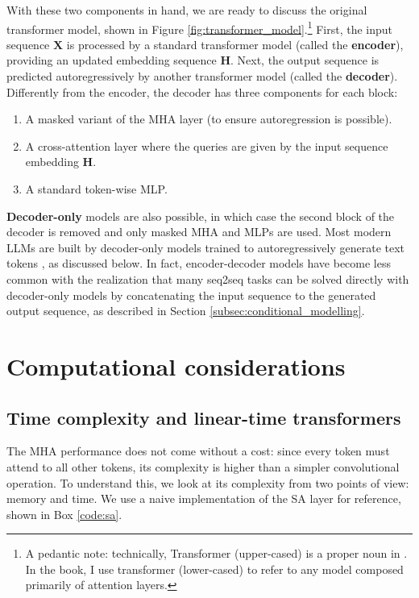 With these two components in hand, we are ready to discuss the original transformer model, shown in Figure \ref{fig:transformer_model}.\footnote{A pedantic note: technically, Transformer (upper-cased) is a proper noun in \cite{vaswani2017attention}. In the book, I use transformer (lower-cased) to refer to any model composed primarily of attention layers.} First, the input sequence $\mathbf{X}$ is processed by a standard transformer model (called the \textbf{encoder}), providing an updated embedding sequence $\mathbf{H}$. Next, the output sequence is predicted autoregressively by another transformer model (called the \textbf{decoder}). Differently from the encoder, the decoder has three components for each block:
%
\begin{enumerate}
\item A masked variant of the MHA layer (to ensure autoregression is possible).
\item A cross-attention layer where the queries are given by the input sequence embedding $\mathbf{H}$.
\item A standard token-wise MLP.
\end{enumerate}
%
\textbf{Decoder-only} models are also possible, in which case the second block of the decoder is removed and only masked MHA and MLPs are used. Most modern LLMs are built by decoder-only models trained to autoregressively generate text tokens \cite{radford2019language}, as discussed below. In fact, encoder-decoder models have become less common with the realization that many seq2seq tasks can be solved directly with decoder-only models by concatenating the input sequence to the generated output sequence, as described in Section \ref{subsec:conditional_modelling}.

\section{Computational considerations}

\subsection{Time complexity and linear-time transformers}
\label{subsec:time_complexity_mha}

The MHA performance does not come without a cost: since every token must attend to all other tokens, its complexity is higher than a simpler convolutional operation. To understand this, we look at its complexity from two points of view: memory and time. We use a naive implementation of the SA layer for reference, shown in Box \ref{code:sa}.

